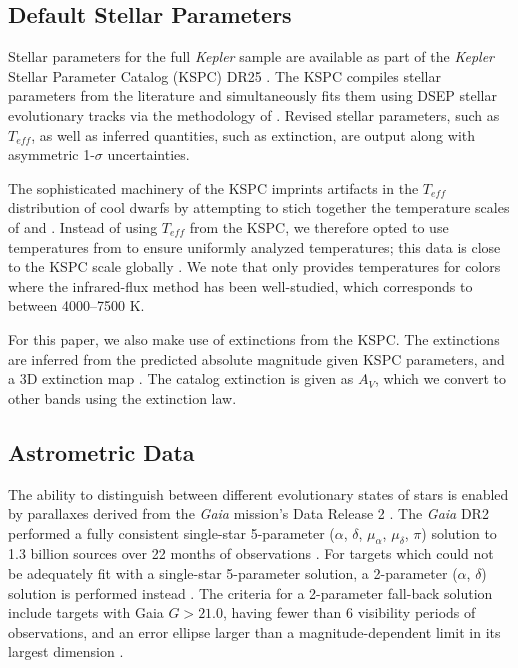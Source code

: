 \documentclass[manuscript]{aastex6}
\newcommand{\Kepler}{\mbox{\textit{Kepler}}}
\newcommand{\Gaia}{\mbox{\textit{Gaia}}}
\newcommand{\Teff}{\ensuremath{T_{eff}}}
\begin{document}
\subsection{Default Stellar Parameters}

Stellar parameters for the full \Kepler{} sample are available as part of the
\Kepler{} Stellar Parameter Catalog (KSPC) DR25 \citep{Mathur17}. The KSPC
compiles stellar parameters from the literature and simultaneously fits them
using DSEP stellar evolutionary tracks \citep{Dotter08} via the methodology of
\citet{Huber14}. Revised stellar parameters, such as \Teff, as well as inferred
quantities, such as extinction, are output along with asymmetric
1-\(\sigma\) uncertainties. 

The sophisticated machinery of the KSPC imprints artifacts in the \Teff{}
distribution of cool dwarfs by attempting to stich together the temperature
scales of \citet{Pinsonneault12} and \citet{Dressing13}. Instead of using
\Teff{} from the KSPC, we therefore opted to use temperatures from 
\citet{Pinsonneault12} to ensure uniformly analyzed temperatures; this data is
close to the KSPC scale globally \citep{Huber17}. We note that 
\citet{Pinsonneault12} only provides temperatures for colors where the
infrared-flux method has been well-studied, which corresponds to between
4000--7500 K.

For this paper, we also make use of extinctions from the KSPC\@. The
extinctions are inferred from the predicted absolute magnitude given KSPC 
parameters, and a 3D extinction map \citep{Amores05}. The catalog extinction 
is given as \(A_V\), which we convert to other bands using the 
\citep{Cardelli89} extinction law. 

\subsection{Astrometric Data}

The ability to distinguish between different evolutionary states of stars is
enabled by parallaxes derived from the \Gaia{} mission's Data Release 2
\citep{Gaia18}. The \Gaia{} DR2 performed a fully consistent single-star
5-parameter (\(\alpha\), \(\delta\), \(\mu_\alpha\), \(\mu_\delta\), \(\pi\))
solution to 1.3 billion sources over 22 months of observations
\citep{Lindegren18}. For targets which could not be adequately fit with a
single-star 5-parameter solution, a 2-parameter (\(\alpha\), \(\delta\))
solution is performed instead \citep{Michalik15}. The criteria for a
2-parameter fall-back solution include targets with Gaia \(G > 21.0\), having
fewer than 6 visibility periods of observations, and an error ellipse larger
than a magnitude-dependent limit in its largest dimension \citep{Lindegren18}.
\end{document}
